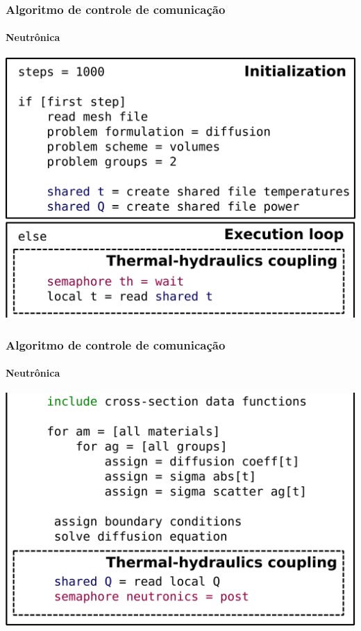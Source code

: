 \documentclass[svgnames,smaller,table]{beamer}
\begin{document}
\begin{frame}
  \frametitle{Algoritmo de controle de comunicação}
  \framesubtitle{Neutrônica}
  \centering\includegraphics[scale=0.4]{../figuras/algo-mil-apre1.png}
\end{frame}

\begin{frame}
  \frametitle{Algoritmo de controle de comunicação}
  \framesubtitle{Neutrônica}
  \centering\includegraphics[scale=0.4]{../figuras/algo-mil-apre2.png}
\end{frame}
\end{document}
